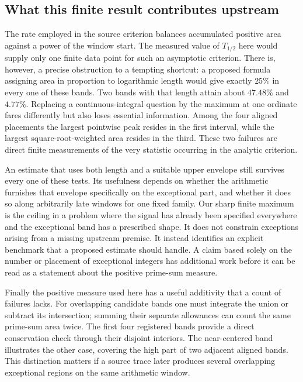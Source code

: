 \documentclass[12pt,letterpaper]{article}
\begin{document}
\subsection{What this finite result contributes upstream}

The rate employed in the source criterion balances accumulated positive area against a power of the window start. The measured value of $T_{1/2}$ here would supply only one finite data point for such an asymptotic criterion. There is, however, a precise obstruction to a tempting shortcut: a proposed formula assigning area in proportion to logarithmic length would give exactly $25\%$ in every one of these bands. Two bands with that length attain about $47.48\%$ and $4.77\%$. Replacing a continuous-integral question by the maximum at one ordinate fares differently but also loses essential information. Among the four aligned placements the largest pointwise peak resides in the first interval, while the largest square-root-weighted area resides in the third. These two failures are direct finite measurements of the very statistic occurring in the analytic criterion.

An estimate that uses both length and a suitable upper envelope still survives every one of these tests. Its usefulness depends on whether the arithmetic furnishes that envelope specifically on the exceptional part, and whether it does so along arbitrarily late windows for one fixed family. Our sharp finite maximum is the ceiling in a problem where the signal has already been specified everywhere and the exceptional band has a prescribed shape. It does not constrain exceptions arising from a missing upstream premise. It instead identifies an explicit benchmark that a proposed estimate should handle. A claim based solely on the number or placement of exceptional integers has additional work before it can be read as a statement about the positive prime-sum measure.

Finally the positive measure used here has a useful additivity that a count of failures lacks. For overlapping candidate bands one must integrate the union or subtract its intersection; summing their separate allowances can count the same prime-sum area twice. The first four registered bands provide a direct conservation check through their disjoint interiors. The near-centered band illustrates the other case, covering the high part of two adjacent aligned bands. This distinction matters if a source trace later produces several overlapping exceptional regions on the same arithmetic window.
\end{document}
